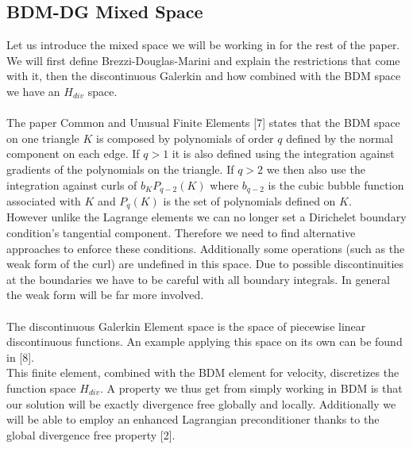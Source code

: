 \documentclass[11pt,twoside,a4paper]{article}
\begin{document}
\subsection{BDM-DG Mixed Space}
Let us introduce the mixed space we will be working in for the rest of the paper. We will first define Brezzi-Douglas-Marini and explain the restrictions that come with it, then the discontinuous Galerkin and how combined with the BDM space we have an $H_{div}$ space.\\
\\
The paper Common and Unusual Finite Elements [7] states that the BDM space on one triangle $K$ is composed by polynomials of order $q$ defined by the normal component on each edge. If $q > 1$ it is also defined using the integration against gradients of the polynomials on the triangle. If $q > 2$ we then also use the integration  against curls of $b_K P_{q-2}(K)$ where $b_{q-2}$ is the cubic bubble function associated with $K$ and $P_{q}(K)$ is the set of polynomials defined on $K$.\\

However unlike the Lagrange elements we can no longer set a Dirichelet boundary condition's tangential component. Therefore we need to find alternative approaches to enforce these conditions.
Additionally some operations (such as the weak form of the curl) are undefined in this space. Due to possible discontinuities at the boundaries we have to be careful with all boundary integrals.
In general the weak form will be far more involved.\\
\\

The discontinuous Galerkin Element space is the space of piecewise linear discontinuous functions. An example applying this space on its own can be found in [8].\\
This finite element, combined with the BDM element for velocity, discretizes the function space $H_{div}$. A property we thus get from simply working in BDM is that our solution will be exactly divergence free globally and locally.
Additionally we will be able to employ an enhanced Lagrangian preconditioner thanks to the global divergence free property [2].\\
\end{document}
